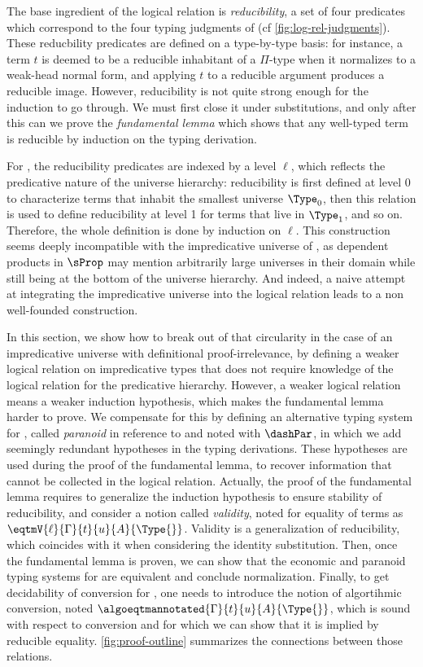 The base ingredient of the logical relation is \emph{reducibility}, a set
of four predicates which correspond to the four typing judgments of \SetoidCC 
(cf \cref{fig:log-rel-judgments}).
% 
These reducbility predicates are defined on a type-by-type basis:
% 
for instance, a term \( t \) is deemed to be a reducible inhabitant of a 
\( \Pi \)-type when it normalizes to a weak-head normal form, and applying
\( t \) to a reducible argument produces a reducible image.
% 
However, reducibility is not quite strong enough for the induction to go 
through. We must first close it under substitutions, and only after this
can we prove the \emph{fundamental lemma} which shows that any well-typed 
term is reducible by induction on the typing derivation.

For \MLTT, the reducibility predicates are indexed by a level
\( \ell \), which reflects the predicative nature of the universe
hierarchy: reducibility is first defined at level $0$ to characterize
terms that inhabit the smallest universe \( \Type_0 \), then this relation is used
to define reducibility at level 1 for terms that live in
\( \Type_1 \), and so on. Therefore, the whole definition is
done by induction on \( \ell \).
%
This construction seems deeply incompatible with the impredicative
universe of \SetoidCC, as dependent products in \( \sProp \) may mention 
arbitrarily large universes in their domain while still being at the bottom
of the universe hierarchy.
% 
And indeed, a naive attempt at integrating the impredicative universe into
the logical relation leads to a non well-founded construction.

In this section, we show how to break out of that circularity in the case of an
impredicative universe with definitional proof-irrelevance, by
defining a weaker logical relation on impredicative types that does
not require knowledge of the logical relation for the predicative
hierarchy.
%
However, a weaker logical relation means a weaker induction hypothesis,
which makes the fundamental lemma harder to prove.
We compensate for this by defining an alternative typing system
for \SetoidCC, called \emph{paranoid} in reference to
 and noted with $\dashPar$,
in which we add seemingly redundant hypotheses in the typing derivations.
These hypotheses are used during the proof of the fundamental lemma, to
recover information that cannot be collected in the logical relation.
%
Actually, the proof of the fundamental lemma requires to generalize
the induction hypothesis to ensure stability of reducibility, and
consider a notion called \emph{validity}, noted for equality of terms as
$\eqtmV{\ell}{\Gamma}{t}{u}{A}{\Type{}}$.
%
Validity is a generalization of reducibility, which coincides with it
when considering the identity substitution.
%
Then, once the fundamental lemma is proven, we can show that the
economic and paranoid typing systems for \SetoidCC are equivalent and
conclude normalization.
%
Finally, to get decidability of conversion for
\SetoidCC, one needs to introduce the notion of algortihmic
conversion, noted $\algoeqtmannotated{\Gamma}{t}{u}{A}{\Type{}}$,
which is sound with respect to conversion and for which we can
show that it is implied by reducible equality.
%
\cref{fig:proof-outline} summarizes the connections between those relations.

